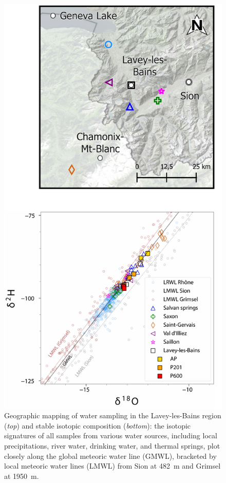 \begin{figure}%
\centering
\includegraphics[height=0.55\textheight]{chapters/03_chap2/figures/figure_2.pdf}
\caption{
Geographic mapping of water sampling in the Lavey-les-Bains region (\textit{top}) and stable isotopic composition (\textit{bottom}): the isotopic signatures of all samples from various water sources, including local precipitations, river water, drinking water, and thermal springs, plot closely along the global meteoric water line (GMWL), bracketed by local meteoric water lines (LMWL) from Sion at \SI{482}{\meter} and Grimsel at \SI{1950}{\meter}.
}
\end{figure}
